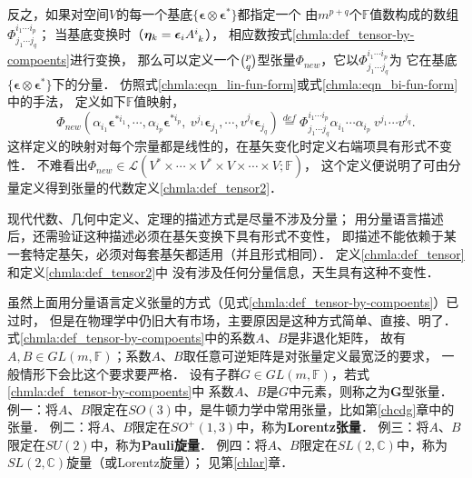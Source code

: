 反之，如果对空间$V$的每一个基底$\{\boldsymbol{\epsilon}\otimes\boldsymbol{\epsilon}^{*}\}$都指定一个
由$m^{p+q}$个$\mathbb{F}$值数构成的数组$\Phi^{i_1 \cdots i_p} _{j_1 \cdots j_q}$；
当基底变换时（$\boldsymbol{\eta}_k = \boldsymbol{\epsilon}_i A_{\hphantom{i} k} ^i$），
相应数按式\eqref{chmla:def_tensor-by-compoents}进行变换，
那么可以定义一个$\binom{p}{q}$型张量$\Phi_{new}$，它以$\Phi^{i_1 \cdots i_p} _{j_1 \cdots j_q}$为
它在基底$\{\boldsymbol{\epsilon}\otimes\boldsymbol{\epsilon}^{*}\}$下的分量．
仿照式\eqref{chmla:eqn_lin-fun-form}或式\eqref{chmla:eqn_bi-fun-form}中的手法，
定义如下$\mathbb{F}$值映射，
\begin{equation*}
    \Phi_{new}\left(\alpha_{i_1}\boldsymbol{\epsilon}^{*i_1},\cdots,
      \alpha_{i_p}\boldsymbol{\epsilon}^{*i_p},\
      v^{j_1}\boldsymbol{\epsilon}_{j_1},\cdots,
      v^{j_q}\boldsymbol{\epsilon}_{j_q} \right)
      \overset{def}{=} \Phi^{i_1 \cdots i_p} _{j_1 \cdots j_q}
      \alpha_{i_1}\cdots\alpha_{i_p}\ v^{j_1}\cdots v^{j_q} .
\end{equation*}
这样定义的映射对每个宗量都是线性的，在基矢变化时定义右端项具有形式不变性．
不难看出$\Phi_{new}\in \mathscr{L}(V^* \times \cdots \times V^*
\times V\times \cdots \times V;\mathbb{F})$，
这个定义便说明了可由分量定义得到张量的代数定义\ref{chmla:def_tensor2}．

现代代数、几何中定义、定理的描述方式是尽量不涉及分量；
用分量语言描述后，还需验证这种描述必须在基矢变换下具有形式不变性，
即描述不能依赖于某一套特定基矢，必须对每套基矢都适用（并且形式相同）．
定义\ref{chmla:def_tensor}和定义\ref{chmla:def_tensor2}中
没有涉及任何分量信息，天生具有这种不变性．

虽然上面用分量语言定义张量的方式（见式\eqref{chmla:def_tensor-by-compoents}）已过时，
但是在物理学中仍旧大有市场，主要原因是这种方式简单、直接、明了．
式\eqref{chmla:def_tensor-by-compoents}中的系数$A$、$B$是非退化矩阵，
故有$A,B\in GL(m,\mathbb{F})$；系数$A$、$B$取任意可逆矩阵是对张量定义最宽泛的要求，
一般情形下会比这个要求要严格．
设有子群$G\in GL(m,\mathbb{F})$，若式\eqref{chmla:def_tensor-by-compoents}中
系数$A$、$B$是$G$中元素，则称之为{\heiti $\boldsymbol{G}$型张量．}
{\kaishu 例一}：将$A$、$B$限定在$SO(3)$中，是牛顿力学中常用张量，比如第\ref{chcdg}章中的张量．
{\kaishu 例二}：将$A$、$B$限定在$SO^{+}(1,3)$中，称为{\heiti \bfseries Lorentz张量}．
{\kaishu 例三}：将$A$、$B$限定在$SU(2)$中，称为{\heiti \bfseries Pauli旋量}．
{\kaishu 例四}：将$A$、$B$限定在$SL(2,\mathbb{C})$中，称为$SL(2,\mathbb{C})${\heiti 旋量}（或Lorentz旋量）；
见第\ref{chlar}章．

